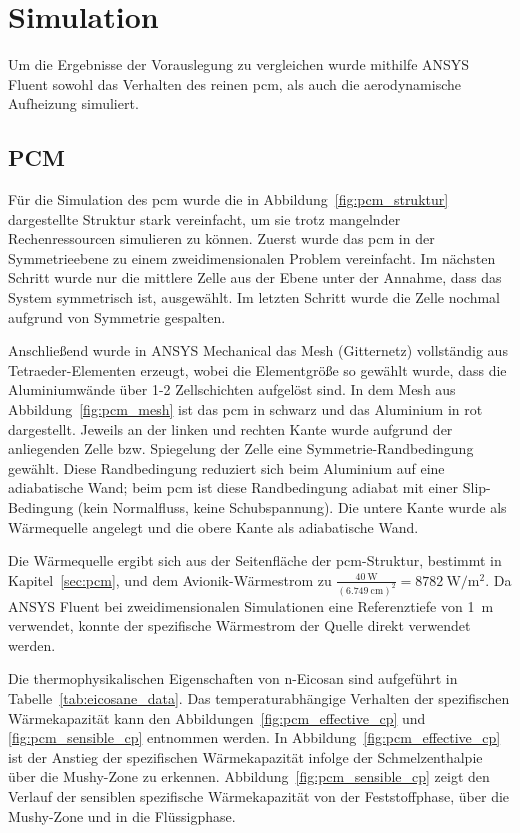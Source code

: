 \chapter{Simulation}\label{chap:Simulation}

Um die Ergebnisse der Vorauslegung zu vergleichen wurde mithilfe ANSYS Fluent sowohl das Verhalten des reinen \ac{pcm}, als auch die
aerodynamische Aufheizung simuliert.

\section{PCM}\label{sec:sim_pcm}

Für die Simulation des \ac{pcm} wurde die in Abbildung~\ref{fig:pcm_struktur} dargestellte Struktur stark vereinfacht,
um sie trotz mangelnder Rechenressourcen simulieren zu können. Zuerst wurde das \ac{pcm} in der Symmetrieebene
zu einem zweidimensionalen Problem vereinfacht. Im nächsten Schritt wurde nur die mittlere Zelle aus der Ebene unter der Annahme,
dass das System symmetrisch ist, ausgewählt. Im letzten Schritt wurde die Zelle nochmal aufgrund von Symmetrie gespalten.

Anschließend wurde in ANSYS Mechanical das Mesh (Gitternetz) vollständig aus Tetraeder-Elementen erzeugt, wobei die Elementgröße so gewählt
wurde, dass die Aluminiumwände über 1-2 Zellschichten aufgelöst sind. In dem Mesh aus Abbildung~\ref{fig:pcm_mesh} ist das \ac{pcm} in schwarz und das Aluminium
in rot dargestellt. Jeweils an der linken und rechten Kante wurde aufgrund der anliegenden Zelle bzw. Spiegelung der Zelle eine
Symmetrie-Randbedingung gewählt. Diese Randbedingung reduziert sich beim Aluminium auf eine adiabatische Wand; beim \ac{pcm}
ist diese Randbedingung adiabat mit einer Slip-Bedingung (kein Normalfluss, keine Schubspannung). Die untere Kante wurde als Wärmequelle angelegt und die obere Kante als adiabatische Wand.

Die Wärmequelle ergibt sich aus der Seitenfläche der \ac{pcm}-Struktur, bestimmt in Kapitel~\ref{sec:pcm}, und dem Avionik-Wärmestrom zu
$\frac{\SI{40}{\watt}}{\left(\SI{6,749}{\centi\meter}\right)^2} = \SI{8782}{\watt\per\meter\squared}$.
Da ANSYS Fluent bei zweidimensionalen Simulationen eine Referenztiefe von \SI{1}{m} verwendet, konnte der spezifische Wärmestrom
der Quelle direkt verwendet werden.

Die thermophysikalischen Eigenschaften von n-Eicosan sind aufgeführt in Tabelle~\ref{tab:eicosane_data}.
Das temperaturabhängige Verhalten der spezifischen Wärmekapazität kann den Abbildungen~\ref{fig:pcm_effective_cp} und \ref{fig:pcm_sensible_cp}
entnommen werden. In Abbildung~\ref{fig:pcm_effective_cp} ist der Anstieg der spezifischen Wärmekapazität infolge der
Schmelzenthalpie über die Mushy-Zone zu erkennen. Abbildung~\ref{fig:pcm_sensible_cp} zeigt den Verlauf der sensiblen spezifische Wärmekapazität
von der Feststoffphase, über die Mushy-Zone und in die Flüssigphase.

